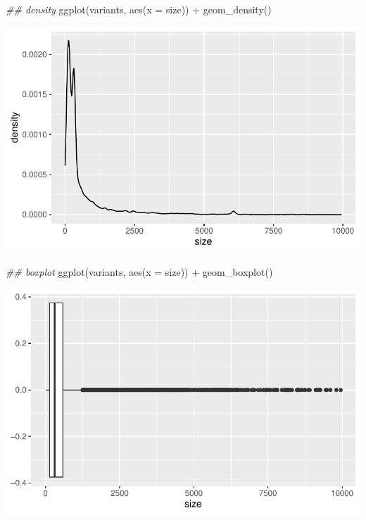 \documentclass[
  letterpaper,
  DIV=11,
  numbers=noendperiod]{scrreprt}
\newenvironment{Shaded}{\begin{snugshade}}{\end{snugshade}}
\newcommand{\AttributeTok}[1]{\textcolor[rgb]{0.40,0.45,0.13}{#1}}
\newcommand{\DocumentationTok}[1]{\textcolor[rgb]{0.37,0.37,0.37}{\textit{#1}}}
\newcommand{\FunctionTok}[1]{\textcolor[rgb]{0.28,0.35,0.67}{#1}}
\newcommand{\NormalTok}[1]{\textcolor[rgb]{0.00,0.23,0.31}{#1}}
\newcommand{\SpecialCharTok}[1]{\textcolor[rgb]{0.37,0.37,0.37}{#1}}
\begin{document}
\begin{Shaded}
\begin{Highlighting}[]
\DocumentationTok{\#\# density}
\FunctionTok{ggplot}\NormalTok{(variants, }\FunctionTok{aes}\NormalTok{(}\AttributeTok{x =}\NormalTok{ size)) }\SpecialCharTok{+}
  \FunctionTok{geom\_density}\NormalTok{()}
\end{Highlighting}
\end{Shaded}

\includegraphics{scripts/02_dataViz/class3_files/figure-pdf/unnamed-chunk-14-2.pdf}

\begin{Shaded}
\begin{Highlighting}[]
\DocumentationTok{\#\# boxplot}
\FunctionTok{ggplot}\NormalTok{(variants, }\FunctionTok{aes}\NormalTok{(}\AttributeTok{x =}\NormalTok{ size)) }\SpecialCharTok{+}
  \FunctionTok{geom\_boxplot}\NormalTok{()}
\end{Highlighting}
\end{Shaded}

\includegraphics{scripts/02_dataViz/class3_files/figure-pdf/unnamed-chunk-14-3.pdf}
\end{document}
